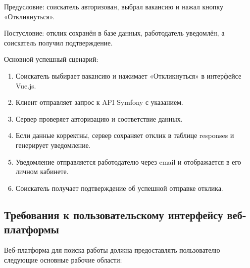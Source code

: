 Предусловие: соискатель авторизован, выбрал вакансию и нажал кнопку «Откликнуться».

Постусловие: отклик сохранён в базе данных, работодатель уведомлён, а соискатель получил подтверждение.

Основной успешный сценарий:

\begin{enumerate}
	\item Соискатель выбирает вакансию и нажимает «Откликнуться» в интерфейсе Vue.js.
	\item Клиент отправляет запрос к API Symfony с указанием.
	\item Сервер проверяет авторизацию и соответствие данных.
	\item Если данные корректны, сервер сохраняет отклик в таблице responses и генерирует уведомление.
	\item Уведомление отправляется работодателю через email и отображается в его личном кабинете.
	\item Соискатель получает подтверждение об успешной отправке отклика.
\end{enumerate}

\subsection{Требования к пользовательскому интерфейсу веб-платформы}

Веб-платформа для поиска работы должна предоставлять пользователю следующие основные рабочие области:

